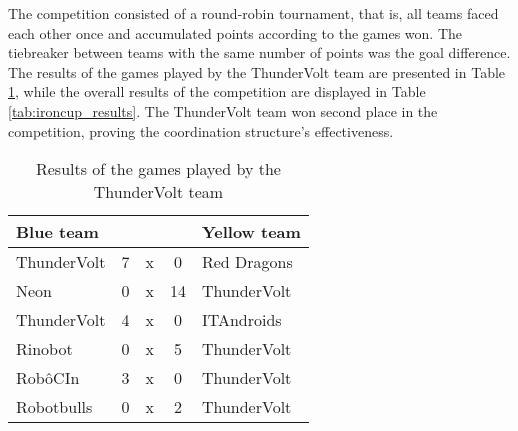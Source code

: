 The competition consisted of a round-robin tournament, that is, all teams faced each other once and accumulated points according to the games won. The tiebreaker between teams with the same number of points was the goal difference. The results of the games played by the ThunderVolt team are presented in Table \ref{tab:ironcup_games}, while the overall results of the competition are displayed in Table  \ref{tab:ironcup_results}. The ThunderVolt team won second place in the competition, proving the coordination structure's effectiveness.

\begin{table}[h]
    \centering
    \begin{tabular}{l c c c l}
        \toprule
        Blue team   &   &   &    & Yellow team \\
        \midrule
        ThunderVolt & 7 & x & 0  & Red Dragons \\
        Neon        & 0 & x & 14 & ThunderVolt \\
        ThunderVolt & 4 & x & 0  & ITAndroids  \\
        Rinobot     & 0 & x & 5  & ThunderVolt \\
        RobôCIn     & 3 & x & 0  & ThunderVolt \\
        Robotbulls  & 0 & x & 2  & ThunderVolt \\
        \bottomrule
    \end{tabular}
    \caption{Results of the games played by the ThunderVolt team \cite{ResultsIRONCup2023}}
    \label{tab:ironcup_games}
\end{table}

